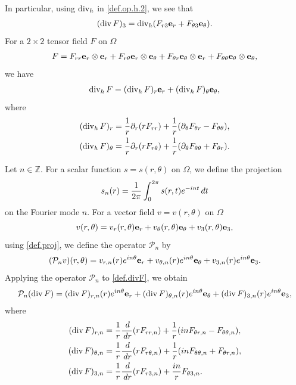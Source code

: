 \documentclass[11pt,a4paper]{article}
\numberwithin{equation}{section}
\newcommand{\Z}{\mathbb{Z}}
\newcommand{\dd}{\,{\rm d}}
\newcommand{\opdiv}{\operatorname{div}}
\newcommand{\h}{{\rm h}}
\begin{document}
%
In particular, using $\opdiv_\h$ in \eqref{def.op.h.2}, we see that 
%
\begin{align}\label{rep.divF.3}
(\opdiv F)_3
= \opdiv_\h (F_{r 3} {\bf e}_r + F_{\theta 3} {\bf e}_\theta). 
\end{align}
%
For a $2\times2$ tensor field $F$ on $\Omega$ 
%
\begin{align*}
F 
= 
F_{r r} {\bf e}_r\otimes {\bf e}_r 
+ F_{r \theta} {\bf e}_r\otimes {\bf e}_\theta
+ F_{\theta r} {\bf e}_\theta\otimes {\bf e}_r 
+ F_{\theta \theta} {\bf e}_\theta\otimes {\bf e}_\theta, 
\end{align*}
%
we have 
%
\begin{align*}
\opdiv_\h F 
= (\opdiv_\h  F)_r {\bf e}_r 
+ (\opdiv_\h  F)_\theta {\bf e}_\theta, 
\end{align*}
%
where
%
\begin{align*}
\begin{split}
(\opdiv_\h F)_r 
&= 
\frac{1}{r} \partial_r (r F_{r r}) 
+ \frac{1}{r} (\partial_\theta F_{\theta r} - F_{\theta \theta}), \\
(\opdiv_\h F)_\theta 
&= 
\frac{1}{r} \partial_r (r F_{r \theta}) 
+ \frac{1}{r} (\partial_\theta F_{\theta \theta} + F_{\theta r}). 
\end{split}
\end{align*}
%


Let $n\in\Z$. For a scalar function $s=s(r,\theta)$ on $\Omega$, we define the projection 
%
\begin{align}\label{def.proj}
s_n(r) 
= \frac{1}{2\pi} \int_{0}^{2\pi} s(r,t) e^{-int} \dd t 
\end{align}
%
on the Fourier mode $n$. For a vector field $v=v(r,\theta)$ on $\Omega$ 
\[
v(r,\theta) 
= v_r(r,\theta) {\bf e}_r 
+ v_\theta(r,\theta) {\bf e}_\theta 
+ v_3(r,\theta) {\bf e}_3, 
\]
using \eqref{def.proj}, we define the operator ${\mathcal P}_n$ by 
%
\begin{align}\label{def.P}
({\mathcal P}_n v)(r,\theta) 
= v_{r,n}(r) e^{in\theta} {\bf e}_r 
+ v_{\theta,n}(r) e^{in\theta} {\bf e}_\theta 
+ v_{3,n}(r) e^{in\theta} {\bf e}_3. 
\end{align}
%
Applying the operator ${\mathcal P}_n$ to \eqref{def.divF}, we obtain 
%
\begin{align*}
{\mathcal P}_n (\opdiv  F) 
= 
(\opdiv  F)_{r,n}(r) e^{i n \theta} {\bf e}_r 
+ (\opdiv  F)_{\theta,n}(r) e^{i n \theta} {\bf e}_\theta 
+ (\opdiv  F)_{3,n}(r) e^{i n \theta} {\bf e}_3, 
\end{align*}
%
where 
%
\begin{align*}
(\opdiv F)_{r,n}
&= 
\frac{1}{r} \frac{\dd}{\dd r} (r F_{r r, n}) 
+ \frac{1}{r} 
(in F_{\theta r, n} - F_{\theta \theta, n}), \\
(\opdiv  F)_{\theta,n}
&= 
\frac{1}{r} \frac{\dd}{\dd r} (r F_{r \theta, n}) 
+ \frac{1}{r} 
(in F_{\theta \theta, n} + F_{\theta r, n}), \\
(\opdiv  F)_{3,n}
&= 
\frac{1}{r} \frac{\dd}{\dd r} (r F_{r 3, n}) 
+ \frac{in}{r} F_{\theta 3, n}. 
\end{align*}
%
\end{document}
